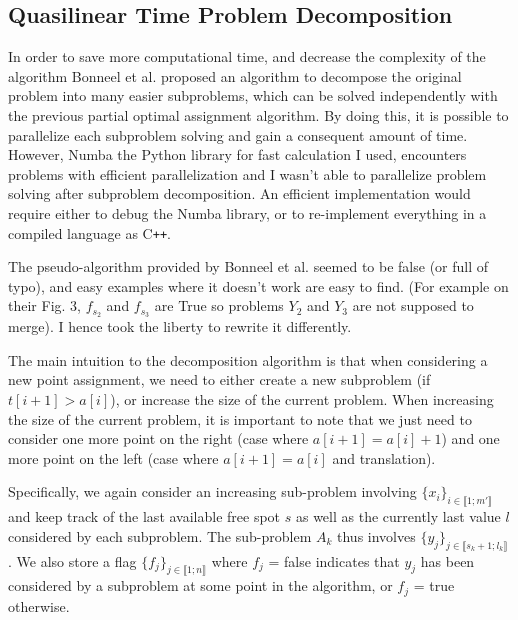 \documentclass[a4paper,12pt]{article}
\begin{document}
\subsection{Quasilinear Time Problem Decomposition}

In order to save more computational time, and decrease the complexity of the algorithm Bonneel et al. \cite{BC19} proposed an algorithm to decompose the original problem into many easier subproblems, which can be solved independently with the previous partial optimal assignment algorithm. By doing this, it is possible to parallelize each subproblem solving and gain a consequent amount of time. However, Numba \cite{Numba} the Python library for fast calculation I used, encounters problems with efficient parallelization and I wasn't able to parallelize problem solving after subproblem decomposition. An efficient implementation would require either to debug the Numba library, or to re-implement everything in a compiled language as C\texttt{++}.

The pseudo-algorithm provided by Bonneel et al. seemed to be false (or full of typo), and easy examples where it doesn't work are easy to find. (For example on their Fig. 3, $f_{s_2}$ and $f_{s_3}$ are True so problems $Y_2$ and $Y_3$ are not supposed to merge). I hence took the liberty to rewrite it differently.

The main intuition to the decomposition algorithm is that when considering a new point assignment, we need to either create a new subproblem (if $t[i+1]>a[i]$), or increase the size of the current problem. When increasing the size of the current problem, it is important to note that we just need to consider one more point on the right (case where $a[i+1] = a[i]+1$) and one more point on the left (case where $a[i+1]=a[i]$ and translation). 

Specifically, we again consider an increasing sub-problem involving $\{x_i\}_{i \in \llbracket 1;m' \rrbracket}$ and keep track of the last available free spot $s$ as well as the currently last value $l$ considered by each subproblem. The sub-problem $A_k$ thus involves $\{y_j\}_{j \in \llbracket s_k+1;l_k \rrbracket}$ . We also store a flag $\{f_j\}_{j \in \llbracket 1;n \rrbracket}$ where $f_j$ = false indicates that $y_j$ has been considered by a subproblem at some point in the algorithm, or $f_j$ = true otherwise. \\
\end{document}
